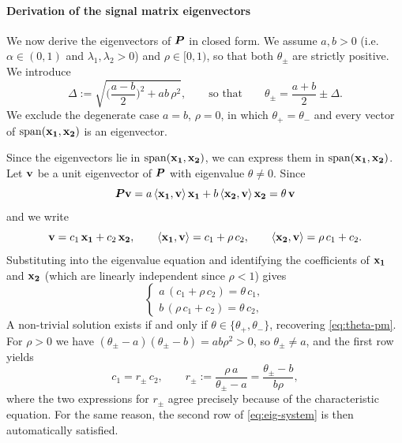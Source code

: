 \paragraph{Derivation of the signal matrix eigenvectors } \label{sec:eigenvect_naive}
We now derive the eigenvectors of $\bm{P}$ in closed form. We assume $a, b > 0$ (i.e.\ $\alpha \in (0,1)$ and $\lambda_1, \lambda_2 > 0$) and $\rho \in [0,1)$, so that both $\theta_\pm$ are strictly positive. We introduce
\begin{equation}
    \Delta := \sqrt{\Big(\frac{a-b}{2}\Big)^2 + ab\,\rho^2},
    \qquad \text{so that} \qquad
    \theta_\pm = \frac{a+b}{2} \pm \Delta.
    \label{eq:Delta}
\end{equation}
We exclude the degenerate case $a = b$, $\rho = 0$, in which $\theta_+ = \theta_-$ and every vector of $\operatorname{span}(\boldsymbol{\mathbf{x_1}},\boldsymbol{\mathbf{x_2}})$ is an eigenvector.

\noindent
Since the eigenvectors lie in $\operatorname{span}(\boldsymbol{\mathbf{x_1}},\boldsymbol{\mathbf{x_2}})$, we can express them in $\operatorname{span}(\boldsymbol{\mathbf{x_1}},\boldsymbol{\mathbf{x_2}})$. Let $\boldsymbol{\mathbf{v}}$ be a unit eigenvector of $\bm{P}$ with eigenvalue $\theta \neq 0$. Since
\begin{equation}
    \bm{P} \boldsymbol{\mathbf{v}} = a\,\langle \boldsymbol{\mathbf{x_1}}, \boldsymbol{\mathbf{v}}\rangle\,\boldsymbol{\mathbf{x_1}} + b\,\langle \boldsymbol{\mathbf{x_2}}, \boldsymbol{\mathbf{v}}\rangle\,\boldsymbol{\mathbf{x_2}} = \theta\,\boldsymbol{\mathbf{v}}
\end{equation}
and we write
\begin{equation}
    \boldsymbol{\mathbf{v}} = c_1\,\boldsymbol{\mathbf{x_1}} + c_2\,\boldsymbol{\mathbf{x_2}},
    \qquad
    \langle \boldsymbol{\mathbf{x_1}}, \boldsymbol{\mathbf{v}}\rangle = c_1 + \rho\, c_2,
    \qquad
    \langle \boldsymbol{\mathbf{x_2}}, \boldsymbol{\mathbf{v}}\rangle = \rho\, c_1 + c_2 .
    \label{eq:ansatz}
\end{equation}
Substituting into the eigenvalue equation and identifying the coefficients of $\boldsymbol{\mathbf{x_1}}$ and $\boldsymbol{\mathbf{x_2}}$ (which are linearly independent since $\rho < 1$) gives
\begin{equation}
    \begin{cases}
        a\,(c_1 + \rho\, c_2) = \theta\, c_1 ,\\[2pt]
        b\,(\rho\, c_1 + c_2) = \theta\, c_2 ,
    \end{cases}
    \label{eq:eig-system}
\end{equation}
A non-trivial solution exists if and only if $\theta \in \{\theta_+, \theta_-\}$, recovering \eqref{eq:theta-pm}. For $\rho > 0$ we have $(\theta_\pm - a)(\theta_\pm - b) = ab\rho^2 > 0$, so $\theta_\pm \neq a$, and the first row yields
\begin{equation}
    c_1 = r_\pm\, c_2,
    \qquad
    r_\pm := \frac{\rho\, a}{\theta_\pm - a} = \frac{\theta_\pm - b}{b\rho},
    \label{eq:ratio}
\end{equation}
where the two expressions for $r_\pm$ agree precisely because of the characteristic equation. For the same reason, the second row of \eqref{eq:eig-system} is then automatically satisfied.

